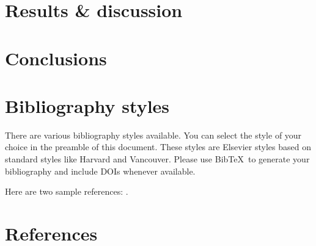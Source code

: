 \documentclass[review]{elsarticle}
\begin{document}
\section{Results \& discussion}

\section{Conclusions}

\section{Bibliography styles}

There are various bibliography styles available. You can select the style of your choice in the preamble of this document. These styles are Elsevier styles based on standard styles like Harvard and Vancouver. Please use Bib\TeX\ to generate your bibliography and include DOIs whenever available.

Here are two sample references: \cite{Feynman1963118,Dirac1953888}.

\section*{References}


\end{document}
